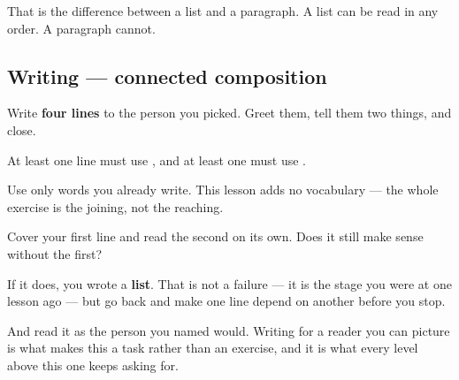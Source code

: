 That is the difference between a list and a paragraph. A list can be read in any order. A paragraph cannot.

\subsection*{Writing — connected composition}
Write \textbf{four lines} to the person you picked. Greet them, tell them two things, and close.

At least one line must use \textbf{}, and at least one must use \textbf{}.

Use only words you already write. This lesson adds no vocabulary — the whole exercise is the joining, not the reaching.

\begin{tcolorbox}[breakable,colback=teal!4,colframe=teal!35!black,title={Before you move on}]
Cover your first line and read the second on its own. Does it still make sense without the first?

If it does, you wrote a \textbf{list}. That is not a failure — it is the stage you were at one lesson ago — but go back and make one line depend on another before you stop.

And read it as the person you named would. Writing for a reader you can picture is what makes this a task rather than an exercise, and it is what every level above this one keeps asking for.
\end{tcolorbox}
